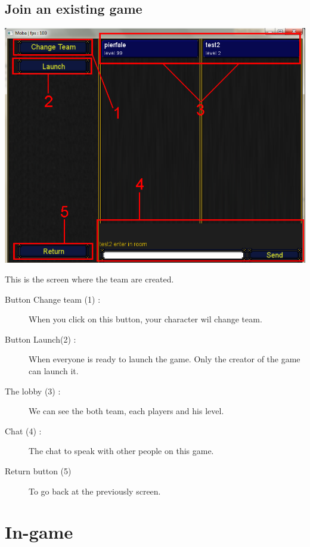 \documentclass{scrreprt}
\begin{document}
		  \section{Join an existing game}
		  \begin{center}
		  \includegraphics[scale=0.4]{lobby_screen.png}
		  \end{center}
		  This is the screen where the team are created.
		   \begin{description}
		  \item[Button Change team (1) :]{When you click on this button, your character wil change team.}
		  \item[Button Launch(2) :]{When everyone is ready to launch the game. Only the creator of the game can launch it.}
		  \item[The lobby (3) :]{We can see the both team, each players and his level.}
		  \item[Chat (4) :]{The chat to speak with other people on this game.}
		  \item[Return button (5)] {To go back at the previously screen.}
  		 \end{description}
		  \chapter{In-game}
\end{document}
